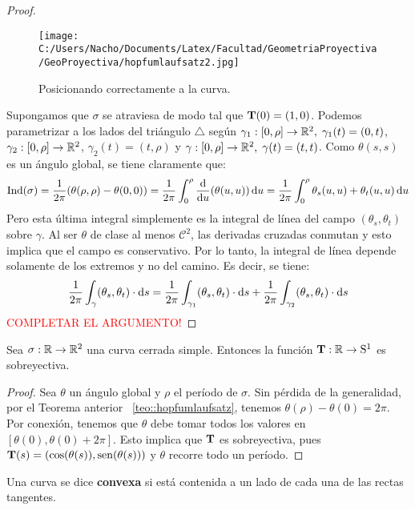 \begin{teo}[Hopf]
\begin{proof}
\begin{figure}[h]
	\centering
		\texttt{[image: C:/Users/Nacho/Documents/Latex/Facultad/GeometriaProyectiva/GeoProyectiva/hopfumlaufsatz2.jpg]}
	\caption{Posicionando correctamente a la curva.}
	\label{fig:hopfumlaufsatz2}
\end{figure}

Supongamos que $\sigma$ se atraviesa de modo tal que $\operatorname{\mathbf{T}}(0)=(1,0)$. Podemos parametrizar a los lados del triángulo $\triangle$ según $\gamma_1:[0,\rho]\to\mathbb{R}^2,\;\gamma_1(t)=(0,t)$, $\gamma_2:[0,\rho]\to\mathbb{R}^2$, $\gamma_2(t)=(t,\rho)$ y $\gamma:[0,\rho]\to\mathbb{R}^2,\; \gamma(t)=(t,t)$. Como $\theta(s,s)$ es un ángulo global, se tiene claramente que: $$\mathrm{Ind}(\sigma)=\dfrac{1}{2\pi}(\theta(\rho,\rho)-\theta(0,0)) = \dfrac{1}{2\pi}\displaystyle\int_{0}^\rho \dfrac{\mathop{}\!\mathrm{d}}{\mathop{}\!\mathrm{d} u}(\theta(u,u))\mathop{}\!\mathrm{d} u = \dfrac{1}{2\pi}\int_0^\rho \theta_s(u,u)+\theta_t(u,u)\mathop{}\!\mathrm{d} u $$ Pero esta última integral simplemente es la integral de línea del campo $(\theta_s,\theta_t)$ sobre $\gamma$. Al ser $\theta$ de clase al menos $\mathscr{C}^2$, las derivadas cruzadas conmutan y esto implica que el campo es conservativo. Por lo tanto, la integral de línea depende solamente de los extremos y no del camino. Es decir, se tiene: $$\dfrac{1}{2\pi}\int_{\gamma} (\theta_s,\theta_t)\cdot \mathop{}\!\mathrm{d} s = \dfrac{1}{2\pi}\int_{\gamma_1}(\theta_s,\theta_t)\cdot \mathop{}\!\mathrm{d} s + \dfrac{1}{2\pi}\int_{\gamma_2}(\theta_s,\theta_t)\cdot\mathop{}\!\mathrm{d} s$$
\textcolor{red}{COMPLETAR EL ARGUMENTO!}
\end{proof}
\end{teo}

\begin{cor}
Sea $\sigma:\mathbb{R}\to\mathbb{R}^2$ una curva cerrada simple. Entonces la función $\operatorname{\mathbf{T}}:\mathbb{R}\to\mathrm{S}^1$ es sobreyectiva.
\begin{proof}
Sea $\theta$ un ángulo global y $\rho$ el período de $\sigma$. Sin pérdida de la generalidad, por el Teorema anterior ~\ref{teo::hopfumlaufsatz}, tenemos $\theta(\rho)-\theta(0)=2\pi$. Por conexión, tenemos que $\theta$ debe tomar todos los valores en $[\theta(0),\theta(0)+2\pi]$. Esto implica que $\operatorname{\mathbf{T}}$ es sobreyectiva, pues $\operatorname{\mathbf{T}}(s)=(\cos(\theta(s)),\operatorname{sen}(\theta(s)))$ y $\theta$ recorre todo un período.
\end{proof}
\end{cor}

\begin{defn}
Una curva se dice \textbf{convexa} si está contenida a un lado de cada una de las rectas tangentes.
\end{defn}

